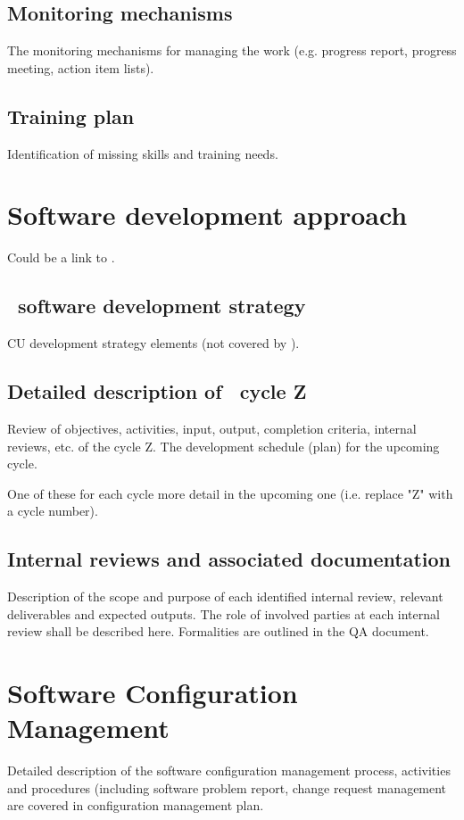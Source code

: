 \documentclass[CUx,lsstdraft,SDP]{lsstdoc}
\begin{document}
\subsection{Monitoring mechanisms  \label{sect:monitoring}}
The monitoring mechanisms for managing the work (e.g. progress report,
progress meeting, action item lists).

\subsection{Training plan  \label{sect:Training Plan}}
Identification of missing skills and training needs.

\section{Software development  approach \label{sect:approach}}
Could be a link to .

\subsection{\CU ~software development strategy \label{sect:strategy}}
CU development strategy elements (not covered by ).

\subsection{Detailed description of \CU ~cycle Z \label{sect:detailcyclez}}
Review of objectives, activities, input, output, completion criteria, internal reviews, etc. of the cycle Z. The development schedule (plan) for the upcoming cycle.

One of these for each cycle more detail in the upcoming one (i.e. replace "Z" with a cycle number).

\subsection{Internal reviews and associated documentation
\label{sect:internalreview}}
Description of the scope and purpose of each identified internal review, relevant deliverables and expected
outputs. The role of involved parties at each internal review shall be
described here. Formalities are outlined in the QA document.

\section{Software Configuration Management \label{sect:configmngt}}
Detailed description of the software configuration management process, activities and procedures (including
software problem report, change request management are covered in
 configuration management plan.
\end{document}
